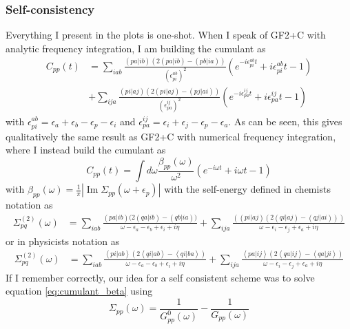 \subsubsection{Self-consistency}
Everything I present in the plots is one-shot. When I speak of GF2+C with analytic frequency integration, I am building the cumulant as
\begin{align}
    C_{pp}(t) &=\sum_{iab} \frac{(pa|ib)\left(2(pa|ib)- (pb|ia)\right)}{\left(\epsilon_{pi}^{ab}\right)^2}
\left(e^{-i \epsilon_{pi}^{ab} t} +i \epsilon_{pi}^{ab} t -1 \right)
\\&+\sum_{ija} \frac{(pi|aj)\left(2(pi|aj)- (pj|ai)\right)}{\left(\epsilon_{pa}^{ij}\right)^2} \left(e^{-i \epsilon_{pa}^{ij} t} +i \epsilon_{pa}^{ij} t -1 \right) \nonumber
\end{align}
with $\epsilon_{pi}^{ab} = \epsilon_{a}+\epsilon_{b}-\epsilon_{p}-\epsilon_{i}$ and
$\epsilon_{pa}^{ij} = \epsilon_{i}+\epsilon_{j}-\epsilon_{p}-\epsilon_{a}$.
 As can be seen, this gives qualitatively the same result as GF2+C with numerical frequency integration, where I instead build the cumulant as
\begin{equation}
    C_{pp}(t) = \int d \omega \frac{\beta_{pp}(\omega)}{\omega^2} \left( e^{-i \omega t} + i \omega t -1 \right)
\end{equation}
with $\beta_{pp}(\omega) = \frac{1}{\pi} |\operatorname{Im} \Sigma_{pp}(\omega + \epsilon_p)|$ with the self-energy defined in chemists notation as
\begin{align}
    \Sigma^{(2)}_{pq}(\omega)
    & = \sum_{iab} \frac{(pa|ib)\Big(2(qa|ib) - (qb|ia)\Big)}{\omega - \epsilon_a - \epsilon_b + \epsilon_i + i \eta} + \sum_{ija} \frac{\left( (pi|aj)(2(qi|aj) - (qj|ai)) \right)}{\omega - \epsilon_i - \epsilon_j + \epsilon_a + i \eta} 
\end{align}
or in physicists notation as
\begin{align}
    \Sigma^{(2)}_{pq}(\omega)
    & = \sum_{iab} \frac{\left<pi|ab\right>\left(2\left<qi|ab\right> - \left<qi|ba\right>\right)}{\omega - \epsilon_a - \epsilon_b + \epsilon_i + i \eta} + \sum_{ija} \frac{\left<pa|ij\right>\left(2\left<qa|ij\right> - \left<qa|ji\right>\right)}{\omega - \epsilon_i - \epsilon_j + \epsilon_a + i \eta}
\end{align}
If I remember correctly, our idea for a self consistent scheme was to solve equation \ref{eq:cumulant_beta} using
\begin{equation}
    \Sigma_{pp}(\omega) = \frac{1}{G^0_{pp}(\omega)} - \frac{1}{G_{pp}(\omega)}
\end{equation}
